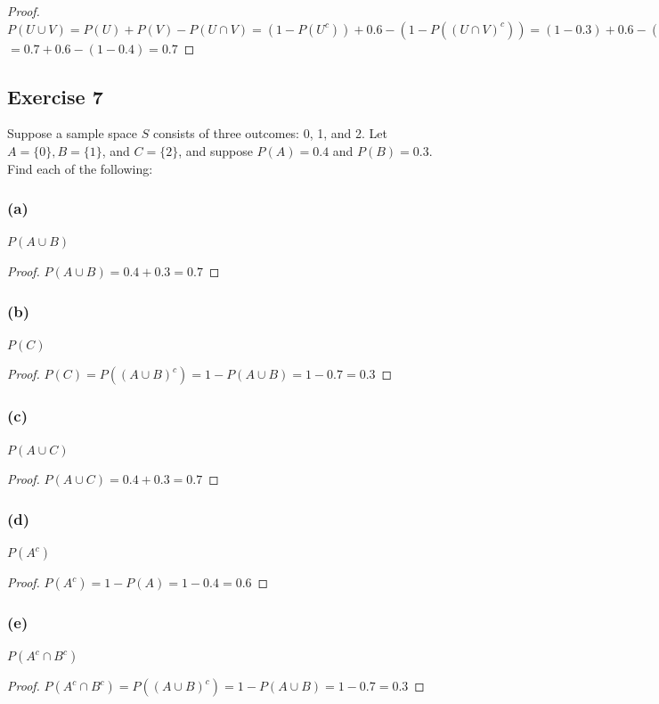 \documentclass[14pt]{extarticle}
\begin{document}
\begin{proof}
\(P(U \cup V) = P(U) + P(V) - P(U \cap V) = (1-P(U^c)) + 0.6 - (1 - P((U \cap V)^c)) = (1-0.3) + 0.6 - (1-P(U^c \cup V^c))\)
\(= 0.7 + 0.6 - (1-0.4) = 0.7\)
\end{proof}

\subsection{Exercise 7}
Suppose a sample space \(S\) consists of three outcomes: 0, 1, and 2. Let \(A = \{0\}, B = \{1\}\), and \(C = \{2\}\), and 
suppose \(P(A) = 0.4\) and \(P(B) = 0.3\). Find each of the following:

\subsubsection{(a)}
\(P(A \cup B)\)
\begin{proof}
\(P(A \cup B) = 0.4 + 0.3 = 0.7\)
\end{proof}

\subsubsection{(b)}
\(P(C)\)
\begin{proof}
\(P(C) = P((A \cup B)^c) = 1 - P(A \cup B) = 1 - 0.7 = 0.3\)
\end{proof}

\subsubsection{(c)}
\(P(A \cup C)\)
\begin{proof}
\(P(A \cup C) = 0.4 + 0.3 = 0.7\)
\end{proof}

\subsubsection{(d)}
\(P(A^c)\)
\begin{proof}
\(P(A^c) = 1 - P(A) = 1 - 0.4 = 0.6\)
\end{proof}

\subsubsection{(e)}
\(P(A^c \cap B^c)\)
\begin{proof}
\(P(A^c \cap B^c) = P((A \cup B)^c) = 1 - P(A \cup B) = 1 - 0.7 = 0.3\)
\end{proof}
\end{document}
